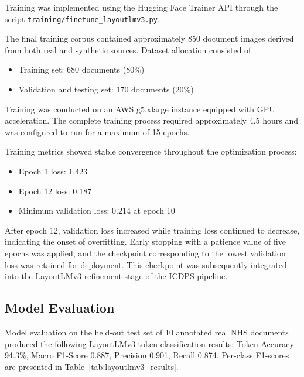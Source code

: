 Training was implemented using the Hugging Face Trainer API through the script \texttt{training/finetune\_layoutlmv3.py}.

The final training corpus contained approximately 850 document images derived from both real and synthetic sources. Dataset allocation consisted of:

\begin{itemize}
\item Training set: 680 documents (80\%)
\item Validation and testing set: 170 documents (20\%)
\end{itemize}

Training was conducted on an AWS g5.xlarge instance equipped with GPU acceleration. The complete training process required approximately 4.5 hours and was configured to run for a maximum of 15 epochs.

Training metrics showed stable convergence throughout the optimization process:

\begin{itemize}
\item Epoch 1 loss: 1.423
\item Epoch 12 loss: 0.187
\item Minimum validation loss: 0.214 at epoch 10
\end{itemize}

After epoch 12, validation loss increased while training loss continued to decrease, indicating the onset of overfitting. Early stopping with a patience value of five epochs was applied, and the checkpoint corresponding to the lowest validation loss was retained for deployment. This checkpoint was subsequently integrated into the LayoutLMv3 refinement stage of the ICDPS pipeline.

\subsection{Model Evaluation}

Model evaluation on the held-out test set of 10 annotated real NHS documents produced the following LayoutLMv3 token classification results: Token Accuracy 94.3\%, Macro F1-Score 0.887, Precision 0.901, Recall 0.874. Per-class F1-scores are presented in Table~\ref{tab:layoutlmv3_results}.

